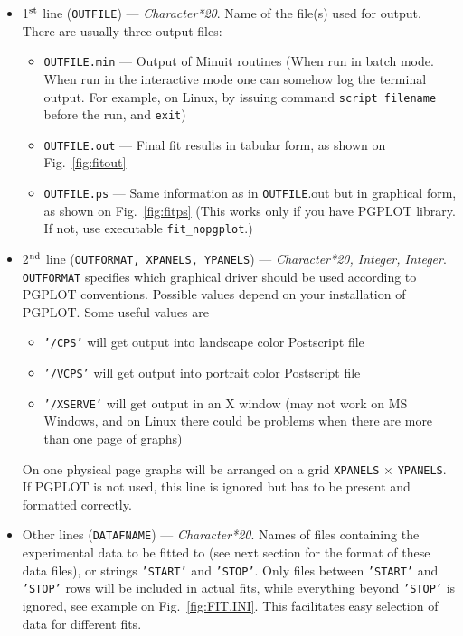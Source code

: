\documentclass[12pt]{article}
\begin{document}
\begin{itemize}

\item
1$^{\rm st}$ line (\texttt{OUTFILE}) --- \emph{Character*20}. Name of the file(s) used for output.
There are usually three output files:
\begin{itemize}
\item \texttt{OUTFILE.min}  ---  Output of Minuit routines (When run in batch mode. When
run in the interactive mode one can somehow log the terminal output. For example,
on Linux, by issuing command \texttt{script filename} before the run, and
\texttt{exit})
\item \texttt{OUTFILE.out}   ---  Final fit results in tabular form, as shown on
Fig.~\ref{fig:fitout}
\item \texttt{OUTFILE.ps}    ---  Same information as in \texttt{OUTFILE}.out but 
in graphical form, as shown on
Fig.~\ref{fig:fitps}  (This works only if you have PGPLOT library. If not, use
executable \texttt{fit\_nopgplot}.)
\end{itemize}

\item 
2$^{\rm nd}$ line (\texttt{OUTFORMAT, XPANELS, YPANELS}) ---  \emph{Character*20, Integer, Integer}.
\texttt{OUTFORMAT} specifies which graphical driver should be used according to PGPLOT conventions. Possible
values depend on your installation of PGPLOT. Some useful values are
  \begin{itemize}
  \item \texttt{'/CPS'}  will get output into landscape color Postscript file 
  \item \texttt{'/VCPS'}  will get output into portrait color Postscript file 
  \item \texttt{'/XSERVE'} will get output in an X window (may not work on MS Windows, and
   on Linux there could be problems when there are more than one page of graphs)
  \end{itemize}
On one physical page graphs will be arranged on a grid \texttt{XPANELS} 
$\times$ \texttt{YPANELS}.
If PGPLOT is not used, this line is ignored but has to be present and formatted correctly.

\item
Other lines (\texttt{DATAFNAME}) --- \emph{Character*20}. Names of
files containing the experimental data to be fitted to (see next
section for the format of these data files), or strings \texttt{'START'} and \texttt{'STOP'}. 
Only files between \texttt{'START'}
and \texttt{'STOP'} rows will be included in actual fits, while everything beyond
\texttt{'STOP'} is ignored, see example on Fig.~\ref{fig:FIT.INI}.
This facilitates easy selection of data for different fits.
\end{itemize}
\end{document}

